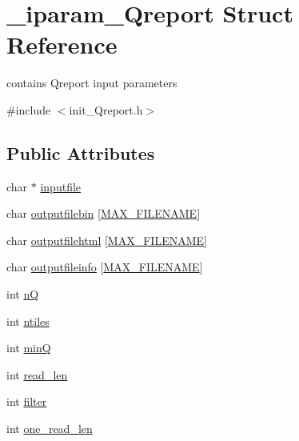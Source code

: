 \hypertarget{struct__iparam__Qreport}{}\section{\+\_\+iparam\+\_\+\+Qreport Struct Reference}
\label{struct__iparam__Qreport}


contains Qreport input parameters  




{\ttfamily \#include $<$init\+\_\+\+Qreport.\+h$>$}

\subsection*{Public Attributes}
\begin{DoxyCompactItemize}
\item 
char $\ast$ \mbox{\hyperlink{struct__iparam__Qreport_ac96f6463d81dc1fcc41850564f24cf11}{inputfile}}
\item 
char \mbox{\hyperlink{struct__iparam__Qreport_abdf92f14bc1c49787cda4b94ceb668cd}{outputfilebin}} \mbox{[}\mbox{\hyperlink{defines_8h_abe0ec333b60117063f9b9fd9f849cb08}{M\+A\+X\+\_\+\+F\+I\+L\+E\+N\+A\+ME}}\mbox{]}
\item 
char \mbox{\hyperlink{struct__iparam__Qreport_a54ffbb27584db445494af7d9a1c214de}{outputfilehtml}} \mbox{[}\mbox{\hyperlink{defines_8h_abe0ec333b60117063f9b9fd9f849cb08}{M\+A\+X\+\_\+\+F\+I\+L\+E\+N\+A\+ME}}\mbox{]}
\item 
char \mbox{\hyperlink{struct__iparam__Qreport_a75f5c38f9365c0c1370040928f43d316}{outputfileinfo}} \mbox{[}\mbox{\hyperlink{defines_8h_abe0ec333b60117063f9b9fd9f849cb08}{M\+A\+X\+\_\+\+F\+I\+L\+E\+N\+A\+ME}}\mbox{]}
\item 
int \mbox{\hyperlink{struct__iparam__Qreport_a47cfa018e6e957cb132e22876a400a1f}{nQ}}
\item 
int \mbox{\hyperlink{struct__iparam__Qreport_a9d91db490f318f69dcea4999f630712e}{ntiles}}
\item 
int \mbox{\hyperlink{struct__iparam__Qreport_a1fa54b38e988ffe30eba5e0284e9dacb}{minQ}}
\item 
int \mbox{\hyperlink{struct__iparam__Qreport_a1004bab2a5776669710b74925ba4d338}{read\+\_\+len}}
\item 
int \mbox{\hyperlink{struct__iparam__Qreport_ae1ce417a16c5d30c05a09ec868154e14}{filter}}
\item 
int \mbox{\hyperlink{struct__iparam__Qreport_a0a09c5cc791e625b948acb45b39164e6}{one\+\_\+read\+\_\+len}}
\end{DoxyCompactItemize}



